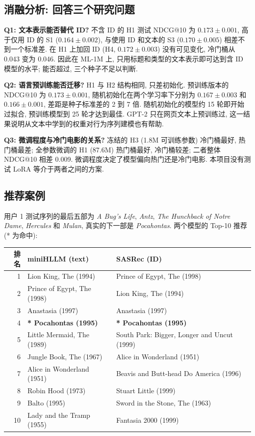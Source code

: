 \documentclass{article}
\begin{document}
\subsection{消融分析: 回答三个研究问题}

\textbf{Q1: 文本表示能否替代 ID?} 不含 ID 的 H1 测试 NDCG@10 为 $0.173 \pm 0.001$, 高于仅用 ID 的 S1 ($0.164 \pm 0.002$), 与使用 ID 和文本的 S3 ($0.170 \pm 0.005$) 相差不到一个标准差. 在 H1 上加回 ID (H4, $0.172 \pm 0.003$) 没有可见变化, 冷门桶从 0.043 变为 0.046. 因此在 ML-1M 上, 只用标题和类型的文本表示即可达到含 ID 模型的水平; 能否超过, 三个种子不足以判断.

\textbf{Q2: 语言预训练能否迁移?} H1 与 H2 结构相同, 只差初始化. 预训练版本的 NDCG@10 为 $0.173 \pm 0.001$, 随机初始化在两个学习率下分别为 $0.167 \pm 0.003$ 和 $0.166 \pm 0.001$, 差距是种子标准差的 2 到 7 倍. 随机初始化的模型约 15 轮即开始过拟合, 预训练模型到 25 轮才达到最佳. GPT-2 只在网页文本上预训练过, 这一结果说明从文本中学到的权重对行为序列建模也有帮助.

\textbf{Q3: 微调程度与冷门电影的关系?} 冻结的 H3 (1.8M 可训练参数) 冷门桶最好, 热门桶最差; 全参数微调的 H1 (87.6M) 热门桶最好, 冷门桶较差; 二者整体 NDCG@10 相差 0.009. 微调程度决定了模型偏向热门还是冷门电影. 本项目没有测试 LoRA 等介于两者之间的方案.

\subsection{推荐案例}

用户 1 测试序列的最后五部为 \emph{A Bug's Life}, \emph{Antz}, \emph{The Hunchback of Notre Dame}, \emph{Hercules} 和 \emph{Mulan}, 真实的下一部是 \emph{Pocahontas}. 两个模型的 Top-10 推荐 (* 为命中):

\begin{center}
\footnotesize
\begin{tabular}{rll}
\toprule
排名 & miniHLLM (text) & SASRec (ID) \\
\midrule
1 & Lion King, The (1994) & Prince of Egypt, The (1998) \\
2 & Prince of Egypt, The (1998) & Lion King, The (1994) \\
3 & Anastasia (1997) & Anastasia (1997) \\
4 & \textbf{* Pocahontas (1995)} & \textbf{* Pocahontas (1995)} \\
5 & Little Mermaid, The (1989) & South Park: Bigger, Longer and Uncut (1999) \\
6 & Jungle Book, The (1967) & Alice in Wonderland (1951) \\
7 & Alice in Wonderland (1951) & Beavis and Butt-head Do America (1996) \\
8 & Robin Hood (1973) & Stuart Little (1999) \\
9 & Balto (1995) & Sword in the Stone, The (1963) \\
10 & Lady and the Tramp (1955) & Fantasia 2000 (1999) \\
\bottomrule
\end{tabular}
\end{center}
\end{document}
